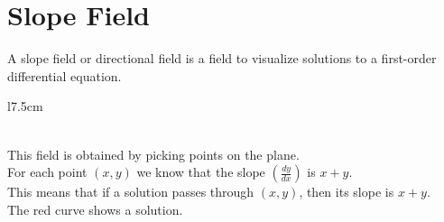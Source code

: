 \documentclass{article}
\begin{document}
\pagebreak

\section{Slope Field}

A slope field or directional field is a field to visualize
solutions to a first-order differential equation.

\begin{wrapfigure}[15]{l}{7.5cm} %

\end{wrapfigure}

\phantom{ } \\

This field is obtained by picking points on the plane. \\
For each point \((x,y)\) we know that the slope \((\frac{dy}{dx})\)
is \(x + y\). \\
This means that if a solution passes through \((x,y)\), then its slope is \(x+y\). \\
The red curve shows a solution.

\phantom{ } \\
\phantom{ } \\
\phantom{ } \\
\phantom{ } \\
\phantom{ } \\
\phantom{ } \\
\phantom{ } \\
\phantom{ } \\
\phantom{ } \\
\phantom{ } \\
\phantom{ } \\
\end{document}
